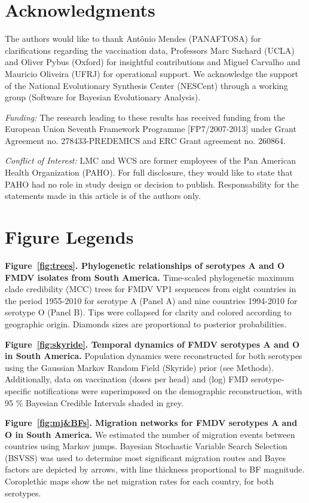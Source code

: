 \documentclass[10pt]{article}
\begin{document}
\section*{Acknowledgments}
The authors would like to thank Ant\^onio Mendes (PANAFTOSA) for clarifications regarding the vaccination data, Professors Marc Suchard (UCLA) and Oliver Pybus (Oxford) for insightful contributions and Miguel Carvalho and Mauricio Oliveira (UFRJ) for operational support.
We acknowledge the support of the National Evolutionary Synthesis Center (NESCent) through a working group (Software for Bayesian Evolutionary Analysis).

\emph{Funding:} The research leading to these results has received funding from the European Union Seventh Framework Programme [FP7/2007-2013] under Grant Agreement no. 278433-PREDEMICS and ERC Grant agreement no. 260864.

\emph{Conflict of Interest:} LMC and WCS are former employees of the Pan American Health Organization (PAHO). For full disclosure, they would like to state that PAHO had no role in study design or decision to publish. Responsability for the statements made in this article is of the authors only.

\newpage

\newpage
\section*{Figure Legends}

{\bf Figure~\ref{fig:trees}. Phylogenetic relationships of serotypes A and O FMDV isolates from South America.} Time-scaled phylogenetic maximum clade credibility (MCC) trees for FMDV VP1 sequences from eight countries in the period 1955-2010 for serotype A (Panel A) and nine countries 1994-2010 for serotype O (Panel B).
Tips were collapsed for clarity and colored according to geographic origin.
Diamonds sizes are proportional to posterior probabilities.

{\bf Figure~\ref{fig:skyride}. Temporal dynamics of FMDV serotypes A and O in South America.} Population dynamics were reconstructed for both serotypes using the Gaussian Markov Random Field (Skyride) prior (see Methods).
Additionally, data on vaccination  (doses per head) and (log) FMD serotype-specific notifications were superimposed on the demographic reconstruction, with 95 \% Bayesian Credible Intervals shaded in grey.
  
{\bf Figure~\ref{fig:mj&BFs}. Migration networks for FMDV serotypes A and O in South America.} We estimated the number of migration events between countries using Markov jumps.
Bayesian Stochastic Variable Search Selection (BSVSS) was used to determine most significant migration routes and Bayes factors are depicted by arrows, with line thickness proportional to BF magnitude.
Coroplethic maps show the net migration rates for each country, for both serotypes.
\end{document}
